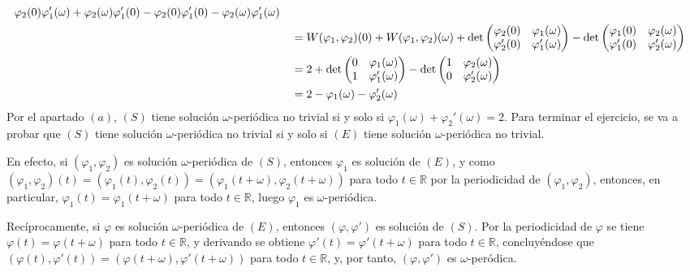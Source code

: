 \documentclass[11pt]{report}
\newcommand{\R}{\mathbb R}
\begin{document}
\begin{itemize}
\[\begin{aligned}[t]
\begin{aligned}[t]
    &\varphi_2(0)\varphi_1'(\omega)+\varphi_2(\omega)\varphi_1'(0)-\varphi_2(0)\varphi_1'(0)-\varphi_2(\omega)\varphi_1'(\omega)
\end{aligned} \\
&=  W(\varphi_1,\varphi_2)(0)+W(\varphi_1,\varphi_2)(\omega)+\textup{det}\begin{pmatrix}
    \varphi_2(0) & \varphi_1(\omega) \\
    \varphi_2'(0)& \varphi_1'(\omega)
\end{pmatrix}-\textup{det}\begin{pmatrix}
    \varphi_1(0) & \varphi_2(\omega) \\
    \varphi_1'(0) & \varphi_2'(\omega)
\end{pmatrix} \\
&=2+\textup{det}\begin{pmatrix}
    0 & \varphi_1(\omega) \\
    1& \varphi_1'(\omega)
\end{pmatrix}-\textup{det}\begin{pmatrix}
    1 & \varphi_2(\omega) \\
    0 & \varphi_2'(\omega)
\end{pmatrix} \\
&=2-\varphi_1(\omega)-\varphi_2'(\omega)
\end{aligned}\]
Por el apartado $(a)$, $(S)$ tiene solución $\omega$-periódica no trivial si y solo si $\varphi_1(\omega)+\varphi_2'(\omega)=2$. Para terminar el ejercicio, se va a probar que $(S)$ tiene solución $\omega$-periódica no trivial si y solo si $(E)$ tiene solución $\omega$-periódica no trivial.

\vspace{2mm}

En efecto, si $(\varphi_1,\varphi_2)$ es solución $\omega$-periódica de $(S)$, entonces $\varphi_1$ es solución de $(E)$, y como $(\varphi_1,\varphi_2)(t)=(\varphi_1(t),\varphi_2(t))=(\varphi_1(t+\omega),\varphi_2(t+\omega))$ para todo $t \in \R$ por la periodicidad de $(\varphi_1,\varphi_2)$, entonces, en particular, $\varphi_1(t)=\varphi_1(t+\omega)$ para todo $t \in \R$, luego $\varphi_1$ es $\omega$-periódica.

\vspace{2mm}

Recíprocamente, si $\varphi$ es solución $\omega$-periódica de $(E)$, entonces $(\varphi,\varphi')$ es solución de $(S)$. Por la periodicidad de $\varphi$ se tiene $\varphi(t)=\varphi(t+\omega)$ para todo $t \in \R$, y derivando se obtiene $\varphi'(t)=\varphi'(t+\omega)$ para todo $t \in \R$, concluyéndose que $(\varphi(t),\varphi'(t))=(\varphi(t+\omega),\varphi'(t+\omega))$ para todo $t \in \R$, y, por tanto, $(\varphi,\varphi')$ es $\omega$-peródica.

\end{itemize}
\end{document}
